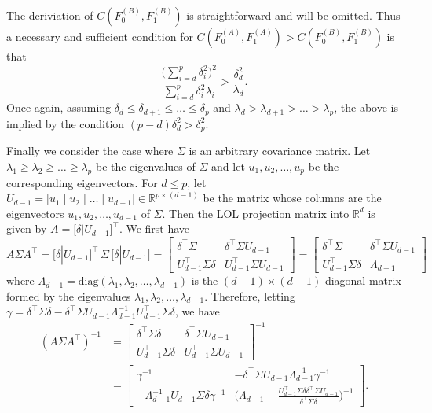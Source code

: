 \documentclass[10pt]{article}
\begin{document}
The deriviation of $C(F_0^{(B)}, F_1^{(B)})$ is straightforward and will be omitted. Thus a necessary and sufficient condition for $C(F_0^{(A)}, F_1^{(A)}) > C(F_0^{(B)}, F_1^{(B)})$ is that
$$ \frac{\bigl(\sum_{i=d}^{p} \delta_i^{2}\bigr)^{2}}{\sum_{i=d}^{p} \delta_i^{2} \lambda_i} > \frac{\delta_{d}^{2}}{\lambda_d}. $$
Once again, assuming $\delta_{d} \leq \delta_{d+1} \leq \dots \leq \delta_{p}$ and $\lambda_d > \lambda_{d+1} > \dots > \lambda_{p}$, the above is implied by the condition $(p - d) \delta_{d}^{2} > \delta_p^2$. 

Finally we consider the case where $\Sigma$ is an arbitrary covariance matrix. Let $\lambda_1 \geq \lambda_2 \geq \dots \geq \lambda_{p}$ be the eigenvalues of $\Sigma$ and let $u_1, u_2, \dots, u_p$ be the corresponding eigenvectors. For $d \leq p$,  let $U_{d-1} = \bigl[ u_1 \mid u_2 \mid \dots \mid u_{d-1}] \in \mathbb{R}^{p \times (d-1)}$ be the matrix whose columns are the eigenvectors $u_1, u_2, \dots, u_{d-1}$ of $\Sigma$. Then the LOL projection matrix into $\mathbb{R}^{d}$ is given by $A = \bigl[ \delta | U_{d-1} \bigr]^{\top}$. We first have
\begin{equation*}
A \Sigma A^{\top} = \bigl[ \delta | U_{d-1} \bigr]^{\top}\, \Sigma \, \bigl[ \delta | U_{d-1} \bigr] = \begin{bmatrix} \delta^{\top} \Sigma & \delta^{\top} \Sigma U_{d-1} \\ U_{d-1}^{\top} \Sigma \delta & U_{d-1}^{\top} \Sigma U_{d-1} \end{bmatrix} = \begin{bmatrix} \delta^{\top} \Sigma & \delta^{\top} \Sigma U_{d-1} \\ U_{d-1}^{\top} \Sigma \delta & \Lambda_{d-1} \end{bmatrix}
\end{equation*}
where $\Lambda_{d-1} = \mathrm{diag}(\lambda_1, \lambda_2, \dots, \lambda_{d-1})$ is the $(d-1) \times (d-1)$ diagonal matrix formed by the eigenvalues $\lambda_1, \lambda_2, \dots, \lambda_{d-1}$. 
Therefore, letting $\gamma = \delta^{\top} \Sigma \delta - \delta^{\top} \Sigma U_{d-1} \Lambda_{d-1}^{-1} U_{d-1}^{\top} \Sigma \delta$, we have
\begin{equation*}
\begin{split}
(A \Sigma A^{\top})^{-1} &= \begin{bmatrix} \delta^{\top} \Sigma \delta & \delta^{\top} \Sigma U_{d-1} \\ U_{d-1}^{\top} \Sigma \delta & U_{d-1}^{\top} \Sigma U_{d-1} \end{bmatrix}^{-1} \\
&= \begin{bmatrix} \gamma^{-1} & - \delta^{\top} \Sigma U_{d-1} \Lambda_{d-1}^{-1} \gamma^{-1} \\
- \Lambda_{d-1}^{-1} U_{d-1}^{\top} \Sigma \delta \gamma^{-1} & \bigl(\Lambda_{d-1} - \frac{U_{d-1}^{\top} \Sigma \delta \delta^{\top} \Sigma U_{d-1}}{\delta^{\top} \Sigma \delta} \bigr)^{-1} \end{bmatrix}. 
\end{split}
\end{equation*}
\end{document}
